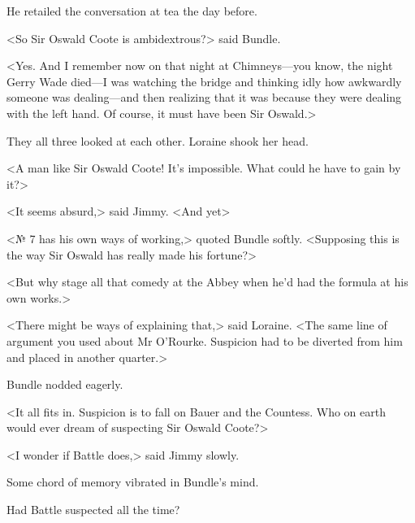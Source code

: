 He retailed the conversation at tea the day before.

<So Sir Oswald Coote is ambidextrous?> said Bundle.

<Yes. And I remember now on that night at Chimneys—you know, the night Gerry Wade died—I was watching the bridge and thinking idly how awkwardly someone was dealing—and then realizing that it was because they were dealing with the left hand. Of course, it must have been Sir Oswald.>

They all three looked at each other. Loraine shook her head.

<A man like Sir Oswald Coote! It's impossible. What could he have to gain by it?>

<It seems absurd,> said Jimmy. <And yet\longdash>

<№ 7 has his own ways of working,> quoted Bundle softly. <Supposing this is the way Sir Oswald has really made his fortune?>

<But why stage all that comedy at the Abbey when he'd had the formula at his own works.>

<There might be ways of explaining that,> said Loraine. <The same line of argument you used about Mr O'Rourke. Suspicion had to be diverted from him and placed in another quarter.>

Bundle nodded eagerly.

<It all fits in. Suspicion is to fall on Bauer and the Countess. Who on earth would ever dream of suspecting Sir Oswald Coote?>

<I wonder if Battle does,> said Jimmy slowly.

Some chord of memory vibrated in Bundle's mind. 

Had Battle suspected all the time?